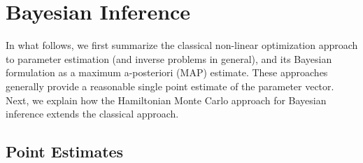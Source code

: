 \section{Bayesian Inference}
\label{sec:bayesian}
%



In what follows, we first summarize the classical non-linear optimization approach to parameter estimation (and inverse problems in general), and its Bayesian formulation as a maximum a-posteriori (MAP) estimate. These approaches generally provide a reasonable single point estimate of the parameter vector. Next, we explain how the Hamiltonian Monte Carlo approach for Bayesian inference extends the classical approach.


\subsection{Point Estimates}
\label{ssec:point_sec}
%

